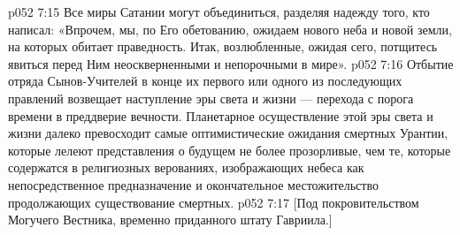 \vs p052 7:15 Все миры Сатании могут объединиться, разделяя надежду того, кто написал: «Впрочем, мы, по Его обетованию, ожидаем нового неба и новой земли, на которых обитает праведность. Итак, возлюбленные, ожидая сего, потщитесь явиться перед Ним неоскверненными и непорочными в мире».
\vs p052 7:16 \pc Отбытие отряда Сынов\hyp{}Учителей в конце их первого или одного из последующих правлений возвещает наступление эры света и жизни --- перехода с порога времени в преддверие вечности. Планетарное осуществление этой эры света и жизни далеко превосходит самые оптимистические ожидания смертных Урантии, которые лелеют представления о будущем не более прозорливые, чем те, которые содержатся в религиозных верованиях, изображающих небеса как непосредственное предназначение и окончательное местожительство продолжающих существование смертных.
\vsetoff
\vs p052 7:17 [Под покровительством Могучего Вестника, временно приданного штату Гавриила.]
